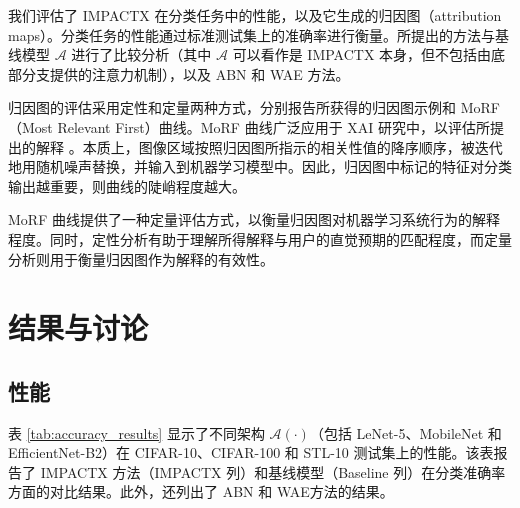 \documentclass[12pt, a4paper]{ctexart} %
\begin{document}
我们评估了 IMPACTX 在分类任务中的性能，以及它生成的归因图（attribution maps）。分类任务的性能通过标准测试集上的准确率进行衡量。所提出的方法与基线模型 \( \mathcal{A} \) 进行了比较分析（其中 \( \mathcal{A} \) 可以看作是 IMPACTX 本身，但不包括由底部分支提供的注意力机制），以及 ABN 和 WAE 方法。

归因图的评估采用定性和定量两种方式，分别报告所获得的归因图示例和 MoRF（Most Relevant First）曲线。MoRF 曲线广泛应用于 XAI 研究中，以评估所提出的解释 。本质上，图像区域按照归因图所指示的相关性值的降序顺序，被迭代地用随机噪声替换，并输入到机器学习模型中。因此，归因图中标记的特征对分类输出越重要，则曲线的陡峭程度越大。

MoRF 曲线提供了一种定量评估方式，以衡量归因图对机器学习系统行为的解释程度。同时，定性分析有助于理解所得解释与用户的直觉预期的匹配程度，而定量分析则用于衡量归因图作为解释的有效性。

\section{结果与讨论}

\subsection{性能}

表 \ref{tab:accuracy_results} 显示了不同架构 \( \mathcal{A}(\cdot) \)（包括 LeNet-5、MobileNet 和 EfficientNet-B2）在 CIFAR-10、CIFAR-100 和 STL-10 测试集上的性能。该表报告了 IMPACTX 方法（IMPACTX 列）和基线模型（Baseline 列）在分类准确率方面的对比结果。此外，还列出了 ABN  和 WAE方法的结果。
\end{document}
